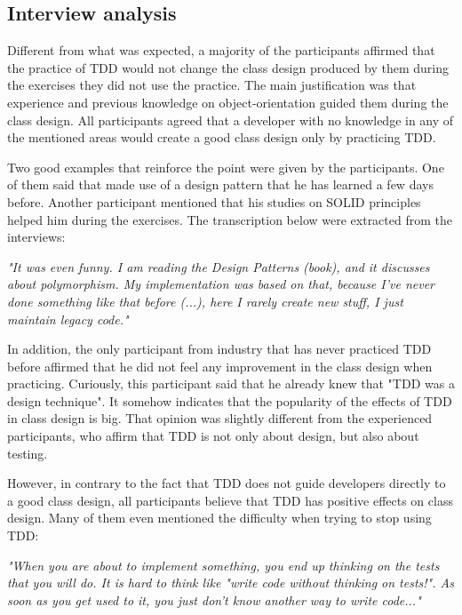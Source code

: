 \documentclass[times]{speauth}
\begin{document}
\subsection{Interview analysis}

Different from what was expected, a majority of the participants affirmed that the
practice of TDD would not change the class design produced by them during the exercises
they did not use the practice.
The main justification was that experience and previous knowledge on object-orientation
guided them during the class design. All participants agreed that a developer with no
knowledge in any of the mentioned areas would create a good class design only by practicing
TDD.

Two good examples that reinforce the point were given by the participants. One of them
said that made use of a design pattern \cite{gof} that he has learned a few days before. Another
participant mentioned that his studies on SOLID principles helped him during the exercises.
The transcription below were extracted from the interviews:

\begin{framed}
	\textit{"It was even funny. I am reading the Design Patterns (book), and it discusses about polymorphism. 
	My implementation was based on that, because I've never done something like that before (...), here I rarely
	create new stuff, I just maintain legacy code."}
\end{framed}

In addition, the only participant from industry that has never practiced TDD before
affirmed that he did not feel any improvement in the class design when practicing.
Curiously, this participant said that he already knew that "TDD was a design technique".
It somehow indicates that the popularity of the effects of TDD in class design
is big.
That opinion was slightly different from the experienced participants, 
who affirm that TDD is not only about design, but also about testing.

However, in contrary to the fact that TDD does not guide developers directly to a
good class design, all participants believe that TDD has positive effects on class design.
Many of them even mentioned the difficulty when trying to stop using TDD:

\begin{framed}

	\textit{"When you are about to implement something, you end up thinking on the tests that you will do. 
	It is hard to think like "write code without thinking on tests!". As soon as you get used to it, 
	you just don't know another way to write code..."}
	
\end{framed}
\end{document}
